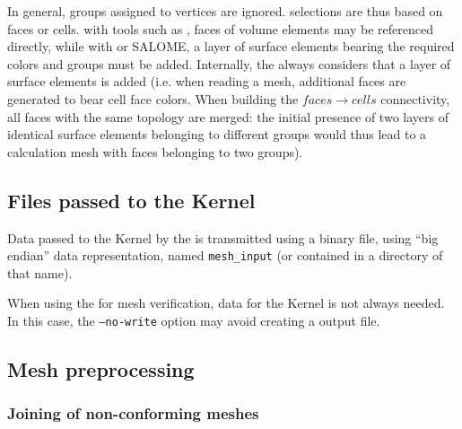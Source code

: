 {{{{In general, groups assigned to vertices are ignored.
selections are thus based on faces or cells. with tools such
as \simail, faces of volume elements may be referenced directly, while
with \ideas or SALOME, a layer of surface elements bearing the required
colors and groups must be added. Internally, the \pcs always considers
that a layer of surface elements is added (i.e. when reading a \simail
mesh, additional faces are generated to bear cell face colors.
When building the $faces \rightarrow cells$ connectivity, all faces with the
same topology are merged: the initial presence of two layers of identical
surface elements belonging to different groups would thus lead to
a calculation mesh with faces belonging to two groups).

\subsection{Files passed to the Kernel\label{sec:pcs:mode_comm}}

Data passed to the Kernel by the \pcs is transmitted using a
binary file, using ``big endian'' data representation, named
\texttt{mesh\_input} (or contained in a directory of that name).

When using the \pcs for mesh verification, data for the Kernel
is not always needed. In this case, the \texttt{--no-write} option may
avoid creating a \pcs output file.

\subsection{Mesh preprocessing%
\label{sec:prepro}}

\subsubsection{Joining of non-conforming meshes}\label{sec:optpcs:join}

}}}}

